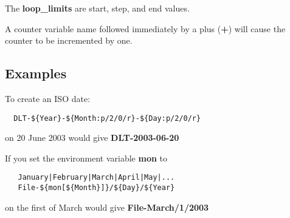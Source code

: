 The {\bf loop\_limits} are start, step, and end values. 

A counter variable name followed immediately by a plus ({\bf +}) will cause
the counter to be incremented by one. 

\subsection*{Examples}

To create an ISO date: 

\footnotesize
\begin{verbatim}
  DLT-${Year}-${Month:p/2/0/r}-${Day:p/2/0/r}
\end{verbatim}
\normalsize

on 20 June 2003 would give {\bf DLT-2003-06-20} 

If you set the environment variable {\bf mon} to 

\footnotesize
\begin{verbatim}
   January|February|March|April|May|...
   File-${mon[${Month}]}/${Day}/${Year}
\end{verbatim}
\normalsize

on the first of March would give {\bf File-March/1/2003 } 

